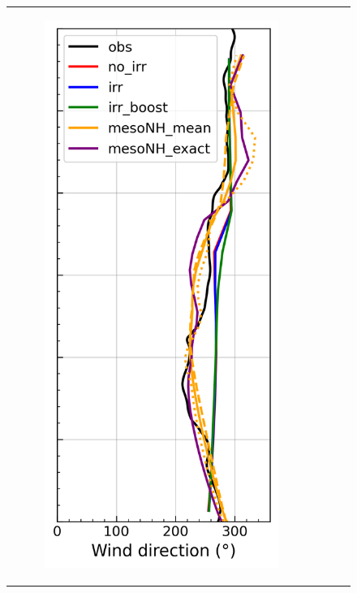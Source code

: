 \begin{figure}[hbtp]
{\begin{tabular}{@{}cccc@{}}
\begin{subfigure}[t]{0.283\textwidth}
            \includegraphics[width=\textwidth]{images/chap5/profiles/profile_elsplans_wind_direction_1507_sensbins.png}

\end{subfigure}
\end{tabular}}
\end{figure}
